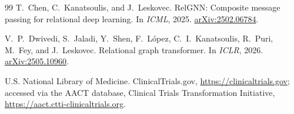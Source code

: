 \documentclass{article}
\begin{document}
\begin{thebibliography}{99}
 T.~Chen, C.~Kanatsoulis, and J.~Leskovec. RelGNN: Composite message passing for relational deep learning. In \emph{ICML}, 2025. \href{https://arxiv.org/abs/2502.06784}{arXiv:2502.06784}.

 V.~P.~Dwivedi, S.~Jaladi, Y.~Shen, F.~L\'opez, C.~I.~Kanatsoulis, R.~Puri, M.~Fey, and J.~Leskovec. Relational graph transformer. In \emph{ICLR}, 2026. \href{https://arxiv.org/abs/2505.10960}{arXiv:2505.10960}.

 U.S. National Library of Medicine. ClinicalTrials.gov, \url{https://clinicaltrials.gov}; accessed via the AACT database, Clinical Trials Transformation Initiative, \url{https://aact.ctti-clinicaltrials.org}.

\end{thebibliography}
\end{document}
